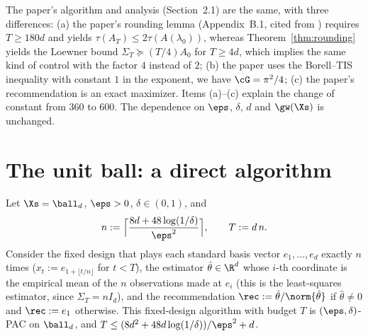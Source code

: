 \begin{remark}
The paper's algorithm and analysis (Section~2.1) are the same, with three differences: (a) the
paper's rounding lemma (Appendix~B.1, cited from \cite{katz2020empirical,allen2021near})
requires $T \ge 180d$ and yields $\tau(A_T) \le 2\tau(A(\lambda_0))$, whereas
Theorem~\ref{thm:rounding} yields the Loewner bound $\Sigma_T \succeq (T/4)A_0$ for $T \ge 4d$,
which implies the same kind of control with the factor $4$ instead of $2$; (b) the paper uses
the Borell--TIS inequality with constant $1$ in the exponent, we have $\cG = \pi^2/4$; (c) the
paper's recommendation is an exact maximizer. Items (a)--(c) explain the change of constant from
$360$ to $600$. The dependence on $\eps$, $\delta$, $d$ and $\gw(\Xs)$ is unchanged.
\end{remark}

\section{The unit ball: a direct algorithm}
\label{sec:upper_ball}

\begin{lemma}\label{lem:ball_identification}
Let $\Xs = \ball_d$, $\eps > 0$, $\delta \in (0,1)$, and
\[
  n := \Big\lceil \frac{8d + 48\log(1/\delta)}{\eps^2}\Big\rceil, \qquad T := d\,n .
\]
Consider the fixed design that plays each standard basis vector $e_1,\dots,e_d$ exactly $n$
times ($x_t := e_{1 + \lfloor t/n\rfloor}$ for $t < T$), the estimator $\hat\theta \in \R^d$ whose
$i$-th coordinate is the empirical mean of the $n$ observations made at $e_i$ (this is the
least-squares estimator, since $\Sigma_T = nI_d$), and the recommendation
$\rec := \hat\theta/\norm{\hat\theta}$ if $\hat\theta \ne 0$ and $\rec := e_1$ otherwise. This
fixed-design algorithm with budget $T$ is $(\eps,\delta)$-PAC on $\ball_d$, and
$T \le (8d^2 + 48d\log(1/\delta))/\eps^2 + d$.
\end{lemma}

